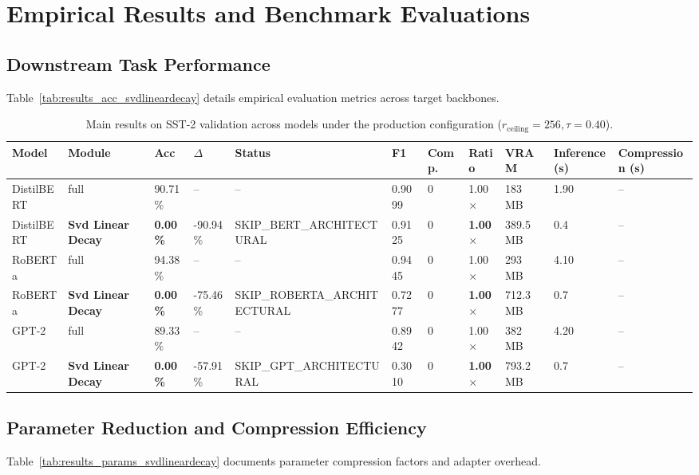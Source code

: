 \section{Empirical Results and Benchmark Evaluations}

\subsection{Downstream Task Performance}
Table~\ref{tab:results_acc_svdlineardecay} details empirical evaluation metrics across target backbones.

\begin{table}[t]
\centering
\small
\begin{tabular}{lllllllllll}
\toprule
\textbf{Model} & \textbf{Module} & \textbf{Acc} & \textbf{$\Delta$} & \textbf{Status} & \textbf{F1} & \textbf{Comp.} & \textbf{Ratio} & \textbf{VRAM} & \textbf{Inference (s)} & \textbf{Compression (s)} \\
\midrule
DistilBERT & full & 90.71\% & -- & -- & 0.9099 & 0 & 1.00$\times$ & 183 MB & 1.90 & -- \\
DistilBERT & \textbf{Svd Linear Decay} & \textbf{0.00\%} & -90.94\% & SKIP_BERT_ARCHITECTURAL & 0.9125 & 0 & \textbf{1.00$\times$} & 389.5 MB & 0.4 & -- \\
RoBERTa & full & 94.38\% & -- & -- & 0.9445 & 0 & 1.00$\times$ & 293 MB & 4.10 & -- \\
RoBERTa & \textbf{Svd Linear Decay} & \textbf{0.00\%} & -75.46\% & SKIP_ROBERTA_ARCHITECTURAL & 0.7277 & 0 & \textbf{1.00$\times$} & 712.3 MB & 0.7 & -- \\
GPT-2 & full & 89.33\% & -- & -- & 0.8942 & 0 & 1.00$\times$ & 382 MB & 4.20 & -- \\
GPT-2 & \textbf{Svd Linear Decay} & \textbf{0.00\%} & -57.91\% & SKIP_GPT_ARCHITECTURAL & 0.3010 & 0 & \textbf{1.00$\times$} & 793.2 MB & 0.7 & -- \\
\bottomrule
\end{tabular}
\caption{Main results on SST-2 validation across models under the production configuration ($r_{\mathrm{ceiling}}=256, \tau=0.40$).}
\label{tab:main_sst2}
\end{table}

\subsection{Parameter Reduction and Compression Efficiency}
Table~\ref{tab:results_params_svdlineardecay} documents parameter compression factors and adapter overhead.

